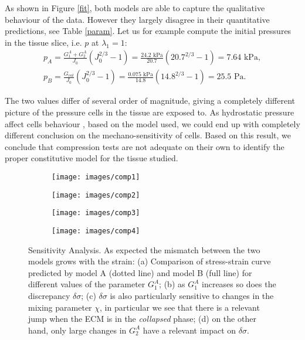 As shown in Figure \ref{fit}, both models are able to capture the qualitative behaviour of the data. However they largely disagree in their quantitative predictions, see Table \ref{param}. Let us for example compute the initial pressures in the tissue slice, i.e. $p$ at $\lambda_1=1$:  
\begin{gather}
p_A = \frac{G^A_1+G^A_2}{J_0}(J_0^{2/3}-1) = \frac{24.2 \text{ kPa}}{20.7}(20.7^{2/3}-1) = 7.64 \text{ kPa},\\
p_B = \frac{G_{vol}}{J_0}(J_0^{2/3}-1) = \frac{0.075 \text{ kPa}}{14.8}(14.8^{2/3}-1) = 25.5 \text{ Pa}.
\end{gather}

The two values differ of several order of magnitude, giving a completely different picture of the pressure cells in the tissue are exposed to. As hydrostatic pressure affect cells behaviour \cite{viscocell}, based on the model used, we could end up with completely different conclusion on the mechano-sensitivity of cells. Based on this result, we conclude that compression tests are not adequate on their own to identify the proper constitutive model for the tissue studied. 

\begin{figure}[h!]
	\begin{subfigure}{0.49\textwidth}
		\texttt{[image: images/comp1]}
		\caption{}
	\end{subfigure}
	\begin{subfigure}{0.49\textwidth}
		\texttt{[image: images/comp2]}
		\caption{}
	\end{subfigure}
	
	\begin{subfigure}{0.49\textwidth}
		\texttt{[image: images/comp3]}
		\caption{}
	\end{subfigure}
	\begin{subfigure}{0.49\textwidth}
		\texttt{[image: images/comp4]}
		\caption{}
	\end{subfigure}
	\caption{Sensitivity Analysis. As expected the mismatch between the two models grows with the strain: (a) Comparison of stress-strain curve predicted by model A (dotted line) and model B (full line) for different values of the parameter $G^A_1$; (b) as $G_1^A$ increases so does the discrepancy $\delta\sigma$; (c) $\delta\sigma$ is also particularly sensitive to changes in the mixing parameter $\chi$, in particular we see that there is a relevant jump when the ECM is in the \textit{collapsed} phase; (d) on the other hand, only large changes in $G^A_2$ have a relevant impact on $\delta\sigma$.}
	\label{comp3}
\end{figure}

